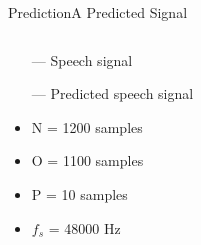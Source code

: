 \begin{frame}{Prediction}{A Predicted Signal}
	\begin{columns}
		\begin{column}{0.4\textwidth}
			\begin{itemize}
				\item[\textcolor{MATLABblue}{---}] Speech signal
				\item[\textcolor{MATLABorange}{---}] Predicted speech signal
				\item N = 1200 samples
				\item O = 1100 samples
				\item P = 10 samples
				\item $f_s$ = 48000 Hz
			\end{itemize}
			
		\end{column}
		\begin{column}{0.6\textwidth} 
			\resizebox{1.0\columnwidth}{!}{	
				
			}
		\end{column}
	\end{columns}
\end{frame}























